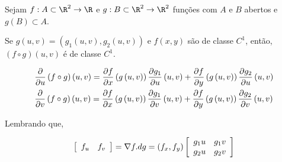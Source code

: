 \documentclass{book}
\begin{document}
\begin{teo}
    Sejam $f:A \subset \R^2 \to \R$ e $g:B \subset \R^2 \to \R^2$ fun\c c\~oes com $A$ e $B$ abertos e $g(B) \subset A$.

    Se $g\left( {u,v} \right) = \left( {g_1 \left( {u,v} \right),g_2 \left( {u,v} \right)} \right)$ e $f(x,y)$ s\~ao de classe $C^1$, ent\~ao, $\left( {f \circ g} \right)\left( {u,v} \right)$ \'e de classe $C^1$.

\[
\begin{gathered}
\frac{\partial }
{{\partial u}}\left( {f \circ g} \right)\left( {u,v} \right) = \frac{{\partial f}}
{{\partial x}}\left( {g\left( {u,v} \right)} \right)\frac{{\partial g_1 }}
{{\partial u}}\left( {u,v} \right) + \frac{{\partial f}}
{{\partial y}}\left( {g\left( {u,v} \right)} \right)\frac{{\partial g_2 }}
{{\partial u}}\left( {u,v} \right) \hfill \\
\frac{\partial }
{{\partial v}}\left( {f \circ g} \right)\left( {u,v} \right) = \frac{{\partial f}}
{{\partial x}}\left( {g\left( {u,v} \right)} \right)\frac{{\partial g_1 }}
{{\partial v}}\left( {u,v} \right) + \frac{{\partial f}}
{{\partial y}}\left( {g\left( {u,v} \right)} \right)\frac{{\partial g_2 }}
{{\partial v}}\left( {u,v} \right) \hfill \\
\end{gathered}
\]

Lembrando que,

\[
\left[ {\begin{array}{*{20}c}
{f_u } & {f_v }  \\

 \end{array} } \right] = \nabla f.dg = \left( {f_x ,f_y } \right)\left[ {\begin{array}{*{20}c}
{g_1 u} & {g_1 v}  \\
{g_2 u} & {g_2 v}  \\

\end{array} } \right]
\]

\end{teo}
\end{document}

